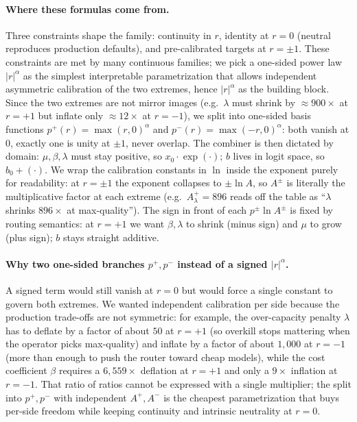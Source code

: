 \documentclass[twocolumn,10pt,a4paper]{article}
\begin{document}
\paragraph{Where these formulas come from.} Three constraints shape the family: continuity in $r$, identity at $r{=}0$ (neutral reproduces production defaults), and pre-calibrated targets at $r{=}\pm 1$. These constraints are met by many continuous families; we pick a one-sided power law $|r|^\alpha$ as the simplest interpretable parametrization that allows independent asymmetric calibration of the two extremes, hence $|r|^\alpha$ as the building block. Since the two extremes are not mirror images (e.g.\ $\lambda$ must shrink by ${\approx}900\times$ at $r{=}{+1}$ but inflate only ${\approx}12\times$ at $r{=}{-1}$), we split into one-sided basis functions $p^{+}(r){=}\max(r,0)^\alpha$ and $p^{-}(r){=}\max(-r,0)^\alpha$: both vanish at $0$, exactly one is unity at $\pm 1$, never overlap. The combiner is then dictated by domain: $\mu, \beta, \lambda$ must stay positive, so $x_0\cdot\exp(\cdot)$; $b$ lives in logit space, so $b_0+(\cdot)$. We wrap the calibration constants in $\ln$ inside the exponent purely for readability: at $r{=}\pm 1$ the exponent collapses to $\pm\ln A$, so $A^\pm$ is literally the multiplicative factor at each extreme (e.g.\ $A_\lambda^{+}{=}896$ reads off the table as ``$\lambda$ shrinks $896\times$ at max-quality''). The sign in front of each $p^{\pm}\ln A^{\pm}$ is fixed by routing semantics: at $r{=}{+1}$ we want $\beta, \lambda$ to shrink (minus sign) and $\mu$ to grow (plus sign); $b$ stays straight additive.

\paragraph{Why two one-sided branches $p^{+}, p^{-}$ instead of a signed $|r|^\alpha$.} A signed term would still vanish at $r{=}0$ but would force a single constant to govern both extremes. We wanted independent calibration per side because the production trade-offs are not symmetric: for example, the over-capacity penalty $\lambda$ has to deflate by a factor of about $50$ at $r{=}{+1}$ (so overkill stops mattering when the operator picks max-quality) and inflate by a factor of about $1{,}000$ at $r{=}{-1}$ (more than enough to push the router toward cheap models), while the cost coefficient $\beta$ requires a $6{,}559{\times}$ deflation at $r{=}{+1}$ and only a $9{\times}$ inflation at $r{=}{-1}$. That ratio of ratios cannot be expressed with a single multiplier; the split into $p^{+}, p^{-}$ with independent $A^{+}, A^{-}$ is the cheapest parametrization that buys per-side freedom while keeping continuity and intrinsic neutrality at $r{=}0$.
\end{document}

